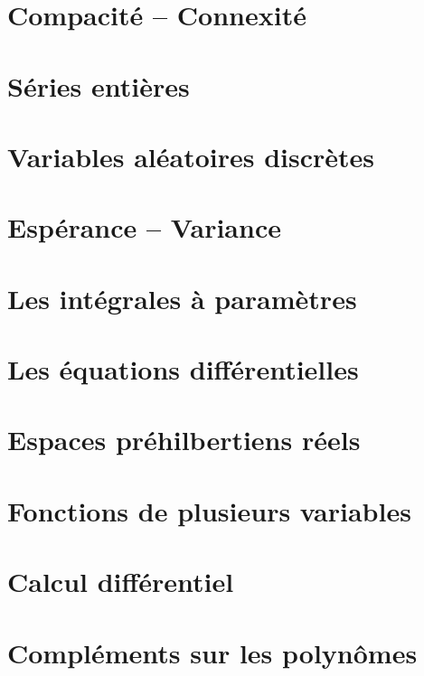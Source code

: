 \documentclass{report}
\begin{document}
\chapter{Compacité -- Connexité}

\chapter{Séries entières}

\chapter{Variables aléatoires discrètes}

\chapter{Espérance -- Variance}

\chapter{Les intégrales à paramètres}

\chapter{Les équations différentielles}

\chapter{Espaces préhilbertiens réels}

\chapter{Fonctions de plusieurs variables}

\chapter{Calcul différentiel}



\chapter{Compléments sur les polynômes}


\end{document}
